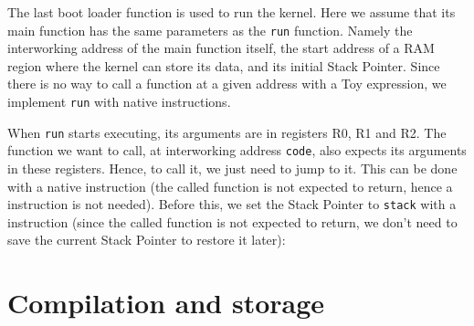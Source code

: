 
The last boot loader function is used to run the kernel. Here we assume that
its main function has the same parameters as the {\tt run} function. Namely the
interworking address of the main function itself, the start address of a RAM
region where the kernel can store its data, and its initial Stack Pointer.
Since there is no way to call a function at a given address with a Toy
expression, we implement {\tt run} with native instructions.

When {\tt run} starts executing, its arguments are in registers R0, R1 and R2.
The function we want to call, at interworking address {\tt code}, also expects
its arguments in these registers. Hence, to call it, we just need to jump to it.
This can be done with a native  instruction (the called function is not
expected to return, hence a  instruction is not needed). Before this,
we set the Stack Pointer to {\tt stack} with a  instruction (since the
called function is not expected to return, we don't need to save the current
Stack Pointer to restore it later):


\section{Compilation and storage}

